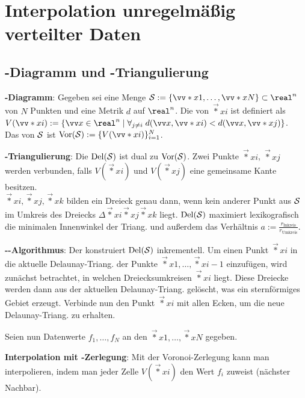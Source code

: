 \chapter{%
    Interpolation unregelmäßig verteilter Daten%
}

\section{%
    -Diagramm und -Triangulierung%
}

\textbf{-Diagramm}:
Gegeben sei eine Menge $\S := \{\vec*{x}{1}, \dotsc, \vec*{x}{N}\} \subset \real^n$ von
$N$ Punkten und eine Metrik $d$ auf $\real^n$.
Die  von $\vec*{x}{i}$ ist definiert als\\
$V(\vec*{x}{i}) := \{\vec{x} \in \real^n \;|\;
\forall_{j\not=i}\; d(\vec{x}, \vec*{x}{i}) < d(\vec{x}, \vec*{x}{j})\}$.\\
Das  von $\S$ ist $\Vor(\S) := \{V(\vec*{x}{i})\}_{i=1}^N$.

\textbf{-Triangulierung}:
Die  $\Del(\S)$ ist dual zu $\Vor(\S)$.
Zwei Punkte $\vec*{x}{i}$, $\vec*{x}{j}$ werden verbunden, falls
$V(\vec*{x}{i})$ und $V(\vec*{x}{j})$ eine gemeinsame Kante besitzen.\\
$\vec*{x}{i}, \vec*{x}{j}, \vec*{x}{k}$ bilden ein Dreieck genau dann, wenn
kein anderer Punkt aus $\S$ im Umkreis des Dreiecks
$\Delta\vec*{x}{i}\vec*{x}{j}\vec*{x}{k}$ liegt.
$\Del(\S)$ maximiert lexikografisch die minimalen Innenwinkel der Triang. und außerdem
das Verhältnis $a := \frac{r_\text{Inkreis}}{r_\text{Umkreis}}$.

\textbf{--Algorithmus}:
Der  konstruiert $\Del(\S)$ inkrementell.
Um einen Punkt $\vec*{x}{i}$ in die aktuelle Delaunay-Triang. der Punkte
$\vec*{x}{1}, \dotsc, \vec*{x}{i-1}$ einzufügen,
wird zunächst betrachtet, in welchen Dreiecksumkreisen $\vec*{x}{i}$ liegt.
Diese Dreiecke werden dann aus der aktuellen Delaunay-Triang. gelöscht,
was ein sternförmiges Gebiet erzeugt.
Verbinde nun den Punkt $\vec*{x}{i}$ mit allen Ecken, um die neue Delaunay-Triang. zu erhalten.

\linie

Seien nun Datenwerte $f_1, \dotsc, f_N$ an den $\vec*{x}{1}, \dotsc, \vec*{x}{N}$ gegeben.

\textbf{Interpolation mit -Zerlegung}:
Mit der Voronoi-Zerlegung kann man interpolieren,
indem man jeder Zelle $V(\vec*{x}{i})$ den Wert $f_i$ zuweist
(nächster Nachbar).

